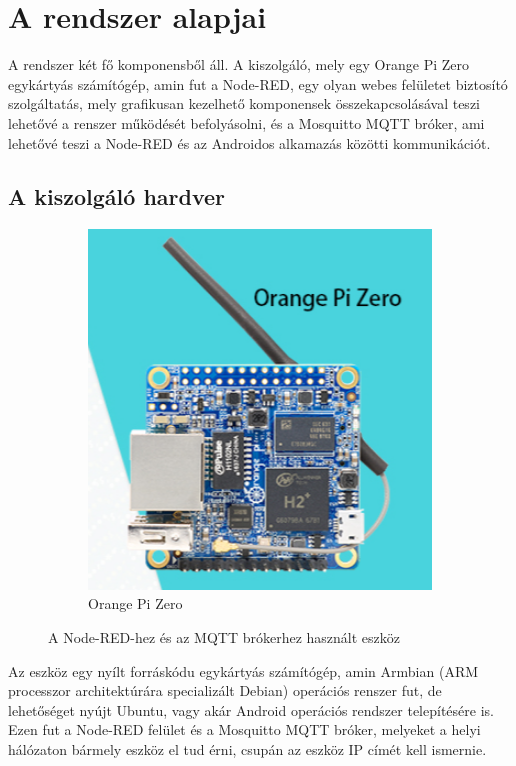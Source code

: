 \documentclass[
]{thesis-ekf}
\theoremstyle{definition}
\theoremstyle{remark}
\begin{document}
\chapter{A rendszer alapjai}
A rendszer két fő komponensből áll. A kiszolgáló, mely egy Orange Pi Zero egykártyás számítógép, amin fut a Node-RED, egy olyan webes felületet biztosító szolgáltatás, mely grafikusan kezelhető komponensek összekapcsolásával teszi lehetővé a renszer működését befolyásolni, és a Mosquitto MQTT bróker, ami lehetővé teszi a Node-RED\cite{nodeRed} és az Androidos alkamazás közötti kommunikációt.

\section{A kiszolgáló hardver}

\begin{figure}[h]
	\begin{subfigure}{0.5\textwidth}
	\includegraphics[width=1\textwidth]{images/OPIZero.png}
	\caption{Orange Pi Zero\cite{orange}}
	\label{fig:subim2}
	\end{subfigure}
	\caption{A Node-RED-hez és az MQTT brókerhez használt eszköz}
	\label{fig:image2}
\end{figure}
Az eszköz egy nyílt forráskódu egykártyás számítógép, amin Armbian\cite{armbian} (ARM processzor architektúrára specializált Debian) operációs renszer fut, 
de lehetőséget nyújt Ubuntu, vagy akár Android operációs rendszer telepítésére is. Ezen fut a Node-RED felület és a Mosquitto MQTT bróker, 
melyeket a helyi hálózaton bármely eszköz el tud érni, csupán az eszköz IP címét kell ismernie.
\end{document}
